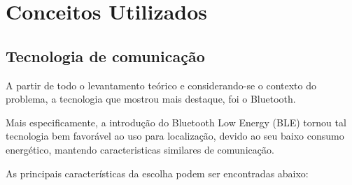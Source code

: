 \chapter{Conceitos Utilizados}

\section{Tecnologia de comunicação}
A partir de todo o levantamento teórico e considerando-se o contexto do problema, a tecnologia que mostrou mais destaque, foi o Bluetooth.

Mais especificamente, a introdução do Bluetooth Low Energy (BLE) tornou tal tecnologia bem favorável ao uso para localização, devido ao seu baixo consumo energético, mantendo caracteristicas similares de comunicação.

As principais características da escolha podem ser encontradas abaixo:

